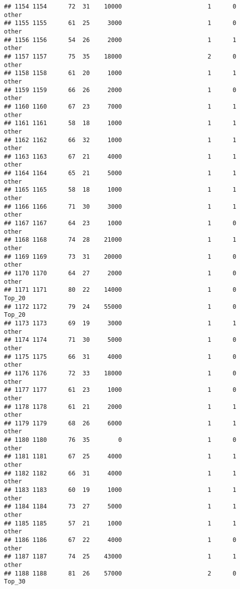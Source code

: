 \documentclass[
]{article}
\begin{document}
\begin{verbatim}
## 1154 1154      72  31    10000                        1      0    other
## 1155 1155      61  25     3000                        1      0    other
## 1156 1156      54  26     2000                        1      1    other
## 1157 1157      75  35    18000                        2      0    other
## 1158 1158      61  20     1000                        1      1    other
## 1159 1159      66  26     2000                        1      0    other
## 1160 1160      67  23     7000                        1      1    other
## 1161 1161      58  18     1000                        1      1    other
## 1162 1162      66  32     1000                        1      1    other
## 1163 1163      67  21     4000                        1      1    other
## 1164 1164      65  21     5000                        1      1    other
## 1165 1165      58  18     1000                        1      1    other
## 1166 1166      71  30     3000                        1      1    other
## 1167 1167      64  23     1000                        1      0    other
## 1168 1168      74  28    21000                        1      1    other
## 1169 1169      73  31    20000                        1      0    other
## 1170 1170      64  27     2000                        1      0    other
## 1171 1171      80  22    14000                        1      0   Top_20
## 1172 1172      79  24    55000                        1      0   Top_20
## 1173 1173      69  19     3000                        1      1    other
## 1174 1174      71  30     5000                        1      0    other
## 1175 1175      66  31     4000                        1      0    other
## 1176 1176      72  33    18000                        1      0    other
## 1177 1177      61  23     1000                        1      0    other
## 1178 1178      61  21     2000                        1      1    other
## 1179 1179      68  26     6000                        1      1    other
## 1180 1180      76  35        0                        1      0    other
## 1181 1181      67  25     4000                        1      1    other
## 1182 1182      66  31     4000                        1      1    other
## 1183 1183      60  19     1000                        1      1    other
## 1184 1184      73  27     5000                        1      1    other
## 1185 1185      57  21     1000                        1      1    other
## 1186 1186      67  22     4000                        1      0    other
## 1187 1187      74  25    43000                        1      1    other
## 1188 1188      81  26    57000                        2      0   Top_30

\end{verbatim}
\end{document}
